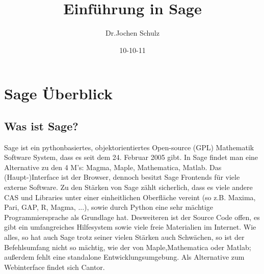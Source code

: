 \documentclass[fontsize=12pt,paper=a4,twoside,bibtotoc,idxtotoc,
liststotoc,pagesize,BCOR1.2cm,DIV15,chapterprefix,pagesize=pdftex]{scrbook}
\title{Einführung in Sage}
\author{Dr.Jochen Schulz}
\date{10-10-11}
\theoremstyle{plain}
\theoremstyle{definition}
\theoremstyle{remark}
\begin{document}
\maketitle
\tableofcontents
\chapter{Sage Überblick}
\section{Was ist Sage?}
Sage ist ein pythonbasiertes, objektorientiertes Open-source (GPL) Mathematik Software System, dass es seit dem 24. Februar 2005 gibt.
In Sage findet man eine Alternative zu den 4 M's: Magma, Maple, Mathematica, Matlab.
Das (Haupt-)Interface ist der Browser, dennoch besitzt Sage Frontends für viele externe Software.
Zu den Stärken von Sage zählt sicherlich, dass es viele andere CAS und Libraries unter einer einheitlichen Oberfläche vereint 
(so z.B. Maxima, Pari, GAP, R, Magma, ...), sowie durch Python eine sehr mächtige Programmiersprache als Grundlage hat. Desweiteren 
ist der Source Code offen, es gibt ein umfangreiches Hilfesystem sowie viele freie Materialien im Internet.
Wie alles, so hat auch Sage trotz seiner vielen Stärken auch Schwächen, so ist der Befehlsumfang nicht so mächtig, wie der von Maple,Mathematica 
oder Matlab; außerdem fehlt eine standalone Entwicklungsumgebung. Als Alternative zum Webinterface findet sich Cantor.
\end{document}
